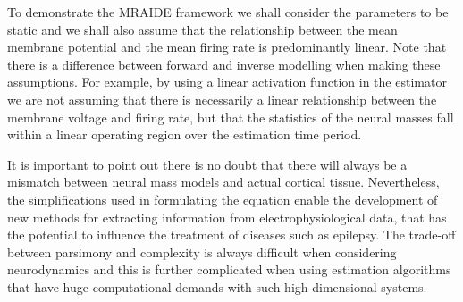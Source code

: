 \documentclass[review,authoryear,3p]{elsarticle}
\begin{document}
To demonstrate the MRAIDE framework we shall consider the parameters to be static and we shall also assume that the relationship between the mean membrane potential and the mean firing rate is predominantly linear. Note that there is a difference between forward and inverse modelling when making these assumptions. For example, by using a linear activation function in the estimator we are not assuming that there is necessarily a linear relationship between the membrane voltage and firing rate, but that the statistics of the neural masses fall within a linear operating region over the estimation time period. 

It is important to point out there is no doubt that there will always be a mismatch between neural mass models and actual cortical tissue. Nevertheless, the simplifications used in formulating the equation enable the development of new methods for extracting information from electrophysiological data, that has the potential to influence the treatment of diseases such as epilepsy. The trade-off between parsimony and complexity is always difficult when considering neurodynamics and this is further complicated when using estimation algorithms that have huge computational demands with such high-dimensional systems.
\end{document}
